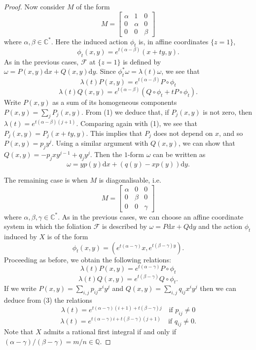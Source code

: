 \documentclass[british]{article}
\newcommand{\oldpage}[1]{\marginpar{\footnotesize$\Big\vert$ \textit{p.~#1}}}
\begin{document}
\begin{proof}
Now consider \(M\) of the form \[
  M
  = \begin{bmatrix}
    \alpha & 1 & 0
  \\0 & \alpha & 0
  \\0 & 0 & \beta
  \end{bmatrix}
\] where \(\alpha,\beta\in\mathbb{C}^*\). Here the induced action
\(\phi_t\) is, in affine coordinates \(\{z=1\}\), \[
  \phi_t(x,y)
  = e^{t(\alpha-\beta)}(x+ty,y).
\] As in the previous cases, \({\mathcal{F}}\) at \(\{z=1\}\) is defined
by \(\omega=P(x,y)\mathrm{d}{x}+Q(x,y)\mathrm{d}{y}\). Since
\(\phi_t^*\omega=\lambda(t)\omega\), we see that \[
  \lambda(t)P(x,y)
  = e^{t(\alpha-\beta)}P\circ\phi_t
  \tag{1}
\] \[
  \lambda(t)Q(x,y)
  = e^{t(\alpha-\beta)}(Q\circ\phi_t + tP\circ\phi_t).
  \tag{2}
\] Write \(P(x,y)\) as a sum of its homogeneous components
\(P(x,y)=\sum_j P_j(x,y)\). From (1) we deduce that, if \(P_j(x,y)\) is
not zero, then \(\lambda(t)=e^{t(\alpha-\beta)(j+1)}\). Comparing again
with (1), we see that \(P_j(x,y)=P_j(x+ty,y)\). This implies that
\(P_j\) does not depend on \(x\), and so \(P(x,y)=p_jy^j\). Using a
similar argument with \(Q(x,y)\), we can show that
\(Q(x,y)=-p_jxy^{j-1}+q_jy^j\). Then the \(1\)-form \(\omega\) can be
written as \[
  \omega
  = yp(y)\mathrm{d}{x} + (q(y)-xp(y))\mathrm{d}{y}.
\]

The remaining case is when \(M\) is diagonalisable, i.e. \[
  M
  = \begin{bmatrix}
    \alpha & 0 & 0
  \\0 & \beta & 0
  \\0 & 0 & \gamma
  \end{bmatrix}
\] where \(\alpha,\beta,\gamma\in\mathbb{C}^*\). \oldpage{54} As in the
previous cases, we can choose an affine coordinate system in which the
foliation \({\mathcal{F}}\) is described by
\(\omega=P\mathrm{d}{x}+Q\mathrm{d}{y}\) and the action \(\phi_t\)
induced by \(X\) is of the form \[
  \phi_t(x,y)
  = (e^{t(\alpha-\gamma)}x,e^{t(\beta-\gamma)y}).
\] Proceeding as before, we obtain the following relations: \[
  \lambda(t)P(x,y)
  = e^{t(\alpha-\gamma)}P\circ\phi_t
  \tag{3}
\] \[
  \lambda(t)Q(x,y)
  = e^{t(\beta-\gamma)}Q\circ\phi_t.
  \tag{4}
\] If we write \(P(x,y)=\sum_{i,j}p_{ij}x^iy^j\) and
\(Q(x,y)=\sum_{i,j}q_{ij}x^iy^j\) then we can deduce from (3) the
relations \[
  \lambda(t)
  = e^{t(\alpha-\gamma)(i+1)+t(\beta-\gamma)j}
  \quad\text{if }p_{ij}\neq0
  \tag{5}
\] \[
  \lambda(t)
  = e^{t(\alpha-\gamma)i+t(\beta-\gamma)(j+1)}
  \quad\text{if }q_{ij}\neq0.
  \tag{6}
\] Note that \(X\) admits a rational first integral if and only if
\((\alpha-\gamma)/(\beta-\gamma)=m/n\in\mathbb{Q}\).


\end{proof}
\end{document}
